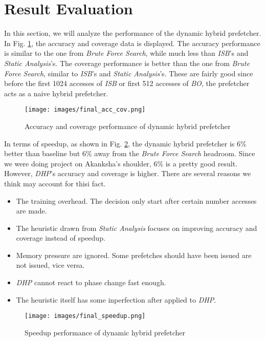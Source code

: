 \section{Result Evaluation}
\label{sec:result}
In this section, we will analyze the performance of the dynamic hybrid prefetcher. In Fig. \ref{fig:final_acc_cov}, the accuracy and coverage data is displayed. The accuracy performance is similar to the one from \emph{Brute Force Search}, while much less than \emph{ISB}'s and \emph{Static Analysis}'s. The coverage performance is better than the one from \emph{Brute Force Search}, similar to \emph{ISB}'s and \emph{Static Analysis}'s. These are fairly good since before the first 1024 accesses of \emph{ISB} or first 512 accesses of \emph{BO}, the prefetcher acts as a naive hybrid prefetcher.

\begin{figure}[ht!]
   \centering
   \texttt{[image: images/final\_acc\_cov.png]}
   \caption{Accuracy and coverage performance of dynamic hybrid prefetcher}
   \label{fig:final_acc_cov}
\end{figure}

In terms of speedup, as shown in Fig. \ref{fig:final_speedup}, the dynamic hybrid prefetcher is 6\% better than baseline but 6\% away from the \emph{Brute Force Search} headroom. Since we were doing project on Akanksha's shoulder, 6\% is a pretty good result. However, \emph{DHP}'s accuracy and coverage is higher. There are several reasons we think may account for thisi fact.
\begin{itemize}
  \item The training overhead. The decision only start after certain number accesses are made.
  \item The heuristic drawn from \emph{Static Analysis} focuses on improving accuracy and coverage instead of speedup.
  \item Memory pressure are ignored. Some prefetches should have been issued are not issued, vice versa.
  \item \emph{DHP} cannot react to phase change fast enough.
  \item The heuristic itself has some inperfection after applied to \emph{DHP}.
\end{itemize}

\begin{figure}[ht!]
   \centering
   \texttt{[image: images/final\_speedup.png]}
   \caption{Speedup performance of dynamic hybrid prefetcher}
   \label{fig:final_speedup}
\end{figure}

